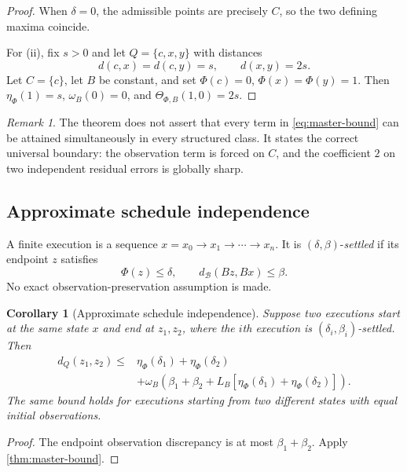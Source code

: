 \documentclass[11pt]{article}
\newtheorem{corollary}[theorem]{Corollary}
\theoremstyle{definition}
\theoremstyle{remark}
\newtheorem{remark}[theorem]{Remark}
\numberwithin{equation}{section}
\newcommand{\cB}{\mathcal B}
\begin{document}
\begin{proof}
When $\delta=0$, the admissible points are precisely $C$, so the two defining maxima coincide.

For (ii), fix $s>0$ and let $Q=\{c,x,y\}$ with distances
\[
 d(c,x)=d(c,y)=s,\qquad d(x,y)=2s.
\]
Let $C=\{c\}$, let $B$ be constant, and set $\Phi(c)=0$, $\Phi(x)=\Phi(y)=1$.  Then $\eta_\Phi(1)=s$, $\omega_B(0)=0$, and $\Theta_{\Phi,B}(1,0)=2s$.
\end{proof}

\begin{remark}
The theorem does not assert that every term in \eqref{eq:master-bound} can be attained simultaneously in every structured class.  It states the correct universal boundary: the observation term is forced on $C$, and the coefficient $2$ on two independent residual errors is globally sharp.
\end{remark}

\subsection{Approximate schedule independence}

A finite execution is a sequence $x=x_0\to x_1\to\cdots\to x_n$.  It is $(\delta,\beta)$-\emph{settled} if its endpoint $z$ satisfies
\[
 \Phi(z)\le\delta,
 \qquad d_{\cB}(Bz,Bx)\le\beta.
\]
No exact observation-preservation assumption is made.

\begin{corollary}[Approximate schedule independence]\label{cor:schedule}
Suppose two executions start at the same state $x$ and end at $z_1,z_2$, where the $i$th execution is $(\delta_i,\beta_i)$-settled.  Then
\begin{equation}\label{eq:schedule}
\begin{split}
 d_Q(z_1,z_2)\le{}&\eta_\Phi(\delta_1)+\eta_\Phi(\delta_2)\\
 &+\omega_B\!\left(
 \beta_1+\beta_2+L_B[\eta_\Phi(\delta_1)+\eta_\Phi(\delta_2)]
 \right).
\end{split}
\end{equation}
The same bound holds for executions starting from two different states with equal initial observations.
\end{corollary}

\begin{proof}
The endpoint observation discrepancy is at most $\beta_1+\beta_2$.  Apply \cref{thm:master-bound}.
\end{proof}
\end{document}
